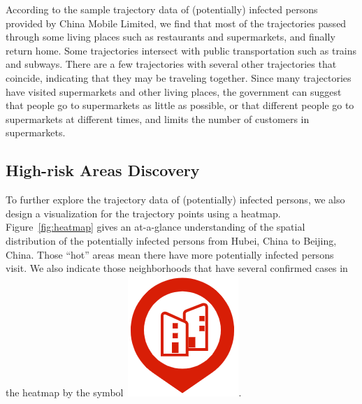 According to the sample trajectory data of (potentially) infected persons provided by China Mobile Limited, we find that most of the trajectories passed through some living places such as restaurants and supermarkets, and finally return home. Some trajectories intersect with public transportation such as trains and subways. There are a few trajectories with several other trajectories that coincide, indicating that they may be traveling together.
%
Since many trajectories have visited supermarkets and other living places, the government can suggest that people go to supermarkets as little as possible, or that different people go to supermarkets at different times, and limits the number of customers in supermarkets.

\subsection{High-risk Areas Discovery}
To further explore the trajectory data of (potentially) infected persons, we also design a visualization for the trajectory points using a heatmap. 
Figure~\ref{fig:heatmap} gives an at-a-glance understanding of the spatial distribution of the potentially infected persons from Hubei, China to Beijing, China.
Those ``hot'' areas mean there have more potentially infected persons visit. 
We also indicate those neighborhoods that have several confirmed cases in the heatmap by the symbol~\includegraphics[height=1.\baselineskip]{figs/marker.png}.

%


